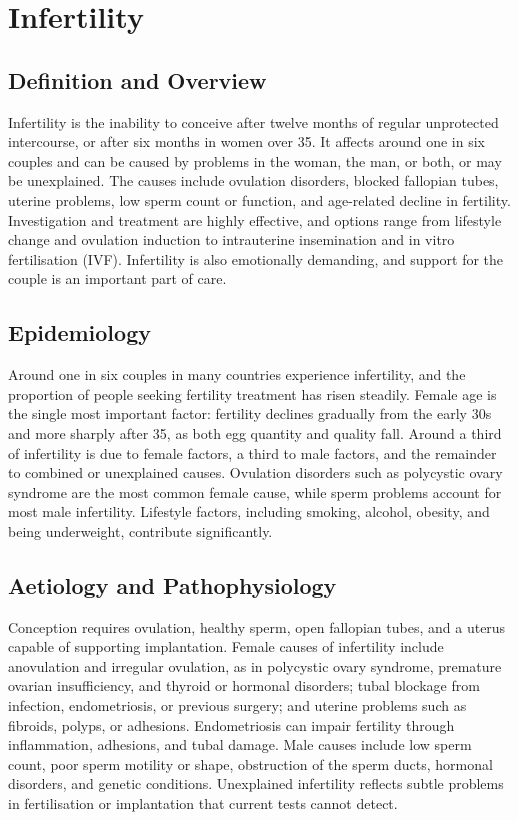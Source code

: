 \chapter{Infertility}

\section*{Definition and Overview}
Infertility is the inability to conceive after twelve months of regular unprotected intercourse, or after six months in women over 35. It affects around one in six couples and can be caused by problems in the woman, the man, or both, or may be unexplained. The causes include ovulation disorders, blocked fallopian tubes, uterine problems, low sperm count or function, and age-related decline in fertility. Investigation and treatment are highly effective, and options range from lifestyle change and ovulation induction to intrauterine insemination and in vitro fertilisation (IVF). Infertility is also emotionally demanding, and support for the couple is an important part of care.

\section*{Epidemiology}
Around one in six couples in many countries experience infertility, and the proportion of people seeking fertility treatment has risen steadily. Female age is the single most important factor: fertility declines gradually from the early 30s and more sharply after 35, as both egg quantity and quality fall. Around a third of infertility is due to female factors, a third to male factors, and the remainder to combined or unexplained causes. Ovulation disorders such as polycystic ovary syndrome are the most common female cause, while sperm problems account for most male infertility. Lifestyle factors, including smoking, alcohol, obesity, and being underweight, contribute significantly.

\section*{Aetiology and Pathophysiology}
Conception requires ovulation, healthy sperm, open fallopian tubes, and a uterus capable of supporting implantation. Female causes of infertility include anovulation and irregular ovulation, as in polycystic ovary syndrome, premature ovarian insufficiency, and thyroid or hormonal disorders; tubal blockage from infection, endometriosis, or previous surgery; and uterine problems such as fibroids, polyps, or adhesions. Endometriosis can impair fertility through inflammation, adhesions, and tubal damage. Male causes include low sperm count, poor sperm motility or shape, obstruction of the sperm ducts, hormonal disorders, and genetic conditions. Unexplained infertility reflects subtle problems in fertilisation or implantation that current tests cannot detect.

